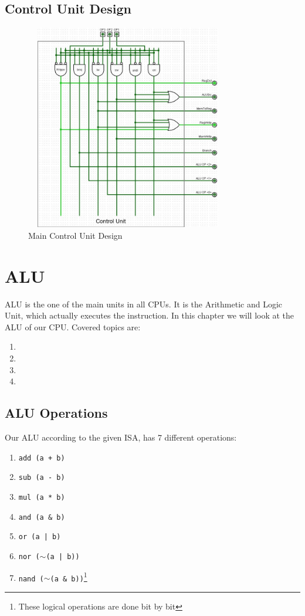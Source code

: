 \documentclass[12pt, dvipsnames, svgnames, x11names, oneside]{book}
\newenvironment{sansserif}{\sffamily}{\normalfont}
\begin{document}
\section{Control Unit Design}
\begin{figure}[H]
\begin{center}
\includegraphics[width=9cm, height=9cm]{./images/cu}
\end{center}
\caption{Main Control Unit Design}
\end{figure}

\chapter{ALU}
\begin{sansserif}
	ALU is the one  of the main units in all CPUs. It is the Arithmetic and Logic Unit, which actually executes the instruction. In this chapter we will look at the ALU of our CPU. Covered topics are:
	
	\begin{enumerate}
		\item {}
		\item {}
		\item {}
		\item {}
	\end{enumerate}
\end{sansserif}

\clearpage
\section{ALU Operations}\label{sec:alu-ops}
Our ALU according to the given ISA, has 7 different operations:
\begin{enumerate}
\item \texttt{add (a + b)}
\item \texttt{sub (a - b)}
\item \texttt{mul (a * b)}
\item \texttt{and (a \& b)}\footnotemark[1]
\item \texttt{or (a | b)}\footnotemark[1]
\item \texttt{nor ($\sim$(a | b))}\footnotemark[1]
\item \texttt{nand ($\sim$(a \& b))}\footnote{These logical operations are done bit by bit}
\end{enumerate}
\end{document}
